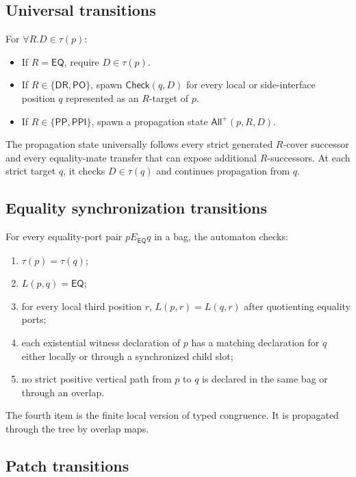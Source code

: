 \documentclass[11pt]{article}
\newcommand{\EQ}{\mathsf{EQ}}
\newcommand{\PP}{\mathsf{PP}}
\newcommand{\PPI}{\mathsf{PPI}}
\newcommand{\PO}{\mathsf{PO}}
\newcommand{\DR}{\mathsf{DR}}
\begin{document}
\subsection{Universal transitions}

For $\forall R.D\in\tau(p)$:
\begin{itemize}
\item If $R=\EQ$, require $D\in\tau(p)$.
\item If $R\in\{\DR,\PO\}$, spawn $\mathsf{Check}(q,D)$ for every local or side-interface position $q$ represented as an $R$-target of $p$.
\item If $R\in\{\PP,\PPI\}$, spawn a propagation state $\mathsf{All}^{+}(p,R,D)$.
\end{itemize}
The propagation state universally follows every strict generated $R$-cover successor and every equality-mate transfer that can expose additional $R$-successors.  At each strict target $q$, it checks $D\in\tau(q)$ and continues propagation from $q$.

\subsection{Equality synchronization transitions}

For every equality-port pair $pE_{\EQ}q$ in a bag, the automaton checks:
\begin{enumerate}[label=(Y\arabic*)]
\item $\tau(p)=\tau(q)$;
\item $L(p,q)=\EQ$;
\item for every local third position $r$, $L(p,r)=L(q,r)$ after quotienting equality ports;
\item each existential witness declaration of $p$ has a matching declaration for $q$ either locally or through a synchronized child slot;
\item no strict positive vertical path from $p$ to $q$ is declared in the same bag or through an overlap.
\end{enumerate}
The fourth item is the finite local version of typed congruence.  It is propagated through the tree by overlap maps.

\subsection{Patch transitions}
\end{document}
